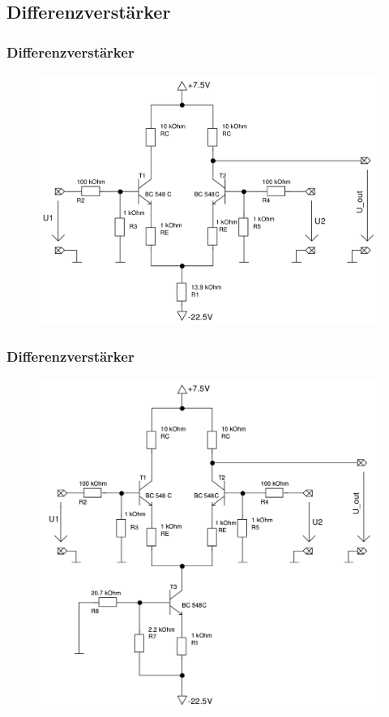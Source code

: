 \subsection{Differenzverstärker} %
\label{sub:Differenzverstärker}
\begin{frame}
    \frametitle{Differenzverstärker}
    \framesubtitle{}
    \begin{figure}[H]
    \begin{center}
            \includegraphics[scale=0.2]{./img/schaltungen/differenz_einfach.png}
    \end{center}
    \end{figure}
\end{frame}
\begin{frame}
    \frametitle{Differenzverstärker}
    \framesubtitle{}
    \begin{figure}[H]
    \begin{center}
            \includegraphics[scale=0.2]{./img/schaltungen/differenz_optimiert.png}
    \end{center}
    \end{figure}
    
\end{frame}

